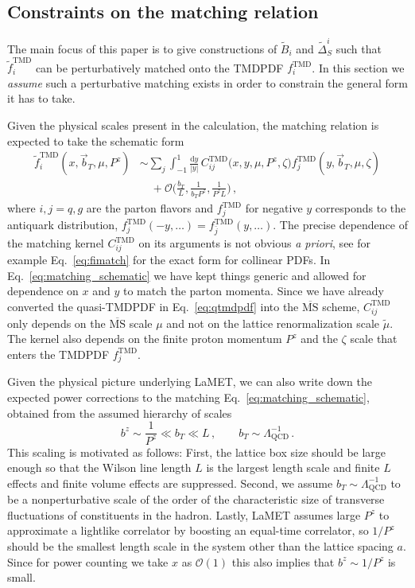 \documentclass[11pt,a4paper]{article}
\DeclareRobustCommand{\eq}[1]{Eq.~\eqref{eq:#1}}
\newcommand{\MS}{\overline{\mathrm{MS}}}
\newcommand{\df}{\mathrm{d}}
\newcommand{\cO}{\mathcal{O}}
\newcommand{\nn}{\nonumber}
\newcommand{\LQCD}{\Lambda_\mathrm{QCD}}
\newcommand\TMD{\mathrm{TMD}}
\newcommand{\bt}{\vec b_T}
\begin{document}
\subsection{Constraints on the matching relation}
\label{sec:schematic_matching}

The main focus of this paper is to give constructions of $\tilde B_i$ and $\tilde \Delta_S^i$ such that $\tilde f_i^\TMD$ can be perturbatively matched onto the TMDPDF $f_i^\TMD$. 
In this section we \emph{assume} such a perturbative matching exists in order to constrain the general form it has to take.

Given the physical scales present in the calculation,
the matching relation is expected to take the schematic form
\begin{align} \label{eq:matching_schematic}
 \tilde f_i^\TMD(x, \bt, \mu, P^z) &
 \sim \sum_j \int_{-1}^1 \frac{\df y}{|y|} \, C^\TMD_{ij}\bigl(x, y, \mu, P^z, \zeta \bigr) f^\TMD_{j}(y, \bt, \mu, \zeta)
 \nn\\&\quad
 + \cO\biggl(\frac{b_T}{L}, \frac{1}{b_T P^z}, \frac{1}{P^z L}\biggr)
\,,\end{align}
where $i,j=q,g$ are the parton flavors and $f^\TMD_{j}$ for negative $y$ corresponds to the antiquark distribution, $f^\TMD_{j}(-y,\ldots)=f^\TMD_{\bar j}(y,\ldots)$. 
The precise dependence of the matching kernel $C_{ij}^\TMD$ on its arguments is not obvious {\it a priori},
see for example \eq{fimatch} for the exact form for collinear PDFs.
In \eq{matching_schematic} we have kept things generic and allowed for dependence on $x$ and $y$ to match the parton momenta.
Since we have already converted the quasi-TMDPDF in \eq{qtmdpdf} into the $\MS$ scheme,
$C^\TMD_{ij}$ only depends on the $\MS$ scale $\mu$ and not on the lattice renormalization scale $\tilde\mu$.
The kernel also depends on the finite proton momentum $P^z$ and the $\zeta$ scale that enters the TMDPDF $f_j^\TMD$.


Given the physical picture underlying LaMET, we can also write down the
expected power corrections to the matching \eq{matching_schematic},
obtained from the assumed hierarchy of scales
\begin{equation}
 b^z \sim \frac{1}{P^z} \ll b_T \ll L
\,,\qquad
 b_T \sim \LQCD^{-1}
\,.\end{equation}
This scaling is motivated as follows:
First, the lattice box size should be large enough so that the Wilson line length $L$ is the largest length scale and finite $L$ effects and finite volume effects are suppressed.
Second, we assume $b_T \sim \LQCD^{-1} $ to be a nonperturbative scale
of the order of the characteristic size of transverse fluctuations of constituents in the hadron.
Lastly, LaMET assumes large $P^z$ to approximate a lightlike correlator by boosting an equal-time correlator, so $1/P^z$ should be the smallest length scale in the system other than the lattice spacing $a$. Since for power counting we take $x$ as $\cO(1)$ this also implies that $b^z\sim 1/P^z$ is small.
\end{document}

